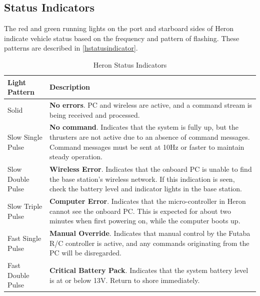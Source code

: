 \documentclass[]{clearpath-latex/clearpath-manual}
\begin{document}
\subsection{Status Indicators} \label{statusindicators}
The red and green running lights on the port and starboard sides of Heron indicate vehicle status based on the frequency and pattern of flashing. These patterns are described in \autoref{hstatusindicator}.

\bgroup
\def\arraystretch{1.5}%
\begin{table}[h]
\centering
\begin{tabular}{m{} p{}}
\rowcolor{lightgrey} 
Light Pattern     & Description                                                                                                                                                                                              \\ \hline
Solid             & \textbf{No errors}. PC and wireless are active, and a command stream is being received and processed.                                                                                                             \\ \hline
Slow Single Pulse & \textbf{No command}. Indicates that the system is fully up, but the thrusters are not active due to an absence of command messages. Command messages must be sent at 10Hz or faster to maintain steady operation. \\ \hline
Slow Double Pulse & \textbf{Wireless Error}. Indicates that the onboard PC is unable to find the base station’s wireless network. If this indication is seen, check the battery level and indicator lights in the base station.       \\ \hline
Slow Triple Pulse & \textbf{Computer Error}. Indicates that the micro-controller in Heron cannot see the onboard PC. This is expected for about two minutes when first powering on, while the computer boots up.                  \\ \hline
Fast Single Pulse & \textbf{Manual Override}. Indicates that manual control by the Futaba R/C controller is active, and any commands originating from the PC will be disregarded.                                                     \\ \hline
Fast Double Pulse & \textbf{Critical Battery Pack}. Indicates that the system battery level is at or below 13V. Return to shore immediately. \\ \hline                                                                                      
\end{tabular}
\newline
\caption{Heron Status Indicators} 
\label{hstatusindicator} 
\end{table}
\egroup
\end{document}
